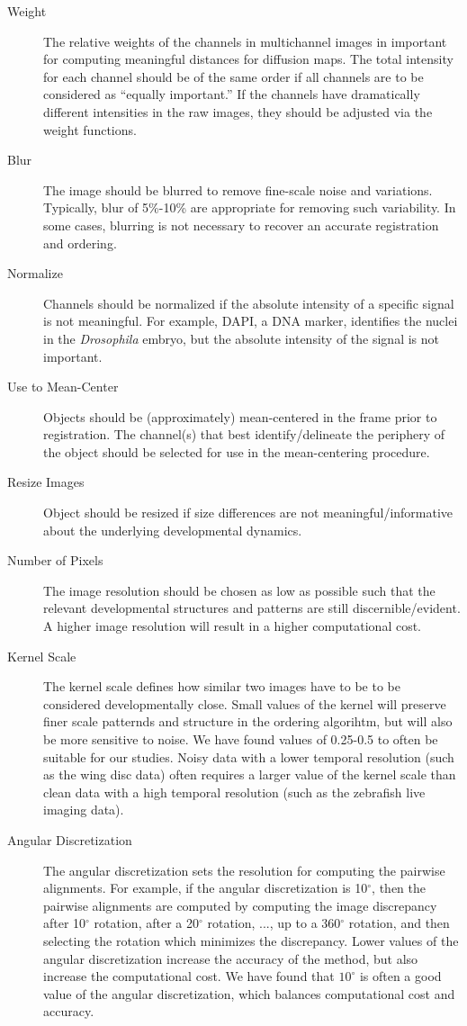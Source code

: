 \documentclass[12pt]{article}
\begin{document}
\begin{description}

\item[Weight] The relative weights of the channels in multichannel images in important for computing meaningful distances for diffusion maps. The total intensity for each channel should be of the same order if all channels are to be considered as ``equally important.'' If the channels have dramatically different intensities in the raw images, they should be adjusted via the weight functions.
%
\item[Blur] The image should be blurred to remove fine-scale noise and variations. Typically, blur of 5\%-10\% are appropriate for removing such variability. In some cases, blurring is not necessary to recover an accurate registration and ordering. 
%
\item[Normalize] Channels should be normalized if the absolute intensity of a specific signal is not meaningful. For example, DAPI, a DNA marker, identifies the nuclei in the {\em Drosophila} embryo, but the absolute intensity of the signal is not important. 
%
\item[Use to Mean-Center] Objects should be (approximately) mean-centered in the frame prior to registration. The channel(s) that best identify/delineate the periphery of the object should be selected for use in the mean-centering procedure.
%
\item[Resize Images] Object should be resized if size differences are not meaningful/informative about the underlying developmental dynamics. 
%
\item[Number of Pixels] The image resolution should be chosen as low as possible such that the relevant developmental structures and patterns are still discernible/evident. A higher image resolution will result in a higher computational cost. 
%
\item[Kernel Scale] The kernel scale defines how similar two images have to be to be considered developmentally close. Small values of the kernel will preserve finer scale patternds and structure in the ordering algorihtm, but will also be more sensitive to noise. We have found values of 0.25-0.5 to often be suitable for our studies. Noisy data with a lower temporal resolution (such as the wing disc data) often requires a larger value of the kernel scale than clean data with a high temporal resolution (such as the zebrafish live imaging data). 
%
\item[Angular Discretization] The angular discretization sets the resolution for computing the pairwise alignments. For example, if the angular discretization is 10$^\circ$, then the pairwise alignments are computed by computing the image discrepancy after 10$^\circ$ rotation, after a 20$^\circ$ rotation, ..., up to a 360$^\circ$ rotation, and then selecting the rotation which minimizes the discrepancy. Lower values of the angular discretization increase the accuracy of the method, but also increase the computational cost. We have found that $10^\circ$ is often a good value of the angular discretization, which balances computational cost and accuracy.

\end{description}
\end{document}

